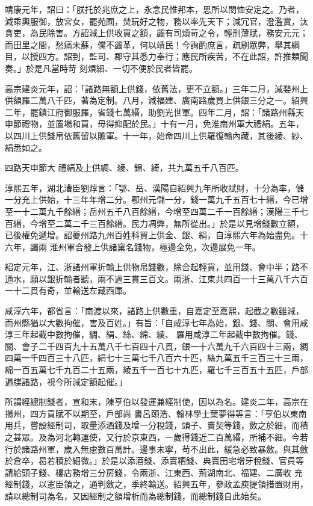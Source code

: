 \begin{pinyinscope}
 靖康元年，詔曰：「朕托於兆庶之上，永念民惟邦本，思所以閔恤安定之。乃者，減乘輿服御，放宮女，罷苑囿，焚玩好之物，務以率先天下；減冗官，澄濫賞，汰貪吏，為民除害。方詔減上供收買之額，蠲有司煩苛之令，輕刑薄賦，務安元元；而田里之間，愁痛未蘇，儻不蠲革，何以靖民！今詢酌庶言，疏剔眾弊，舉其綱目，以授四方。詔到，監司、郡守其悉力奉行；應民所疾苦，不在此詔，許推類聞奏。」於是凡當時苛
 刻煩細、一切不便於民者皆罷。



 高宗建炎元年，詔：「諸路無額上供錢，依舊法，更不立額。」三年二月，減婺州上供額羅二萬八千匹，著為定制。八月，減福建、廣南路歲買上供銀三分之一。紹興二年，罷鎮江府御服羅，省錢七萬緡，助劉光世軍。四年二月，詔：「諸路州縣天申節禮物，並置場和買，毋得抑配於民。」十有一月，免淮南州軍大禮絹。五年，以四川上供錢帛依舊留以贍軍。十一年，始命四川上供羅復輸內藏，其後綾、紗、絹悉如之。



 四路天申節大
 禮絹及上供綢、綾、錦、綺，共九萬五千八百匹。



 淳熙五年，湖北漕臣劉焞言：「鄂、岳、漢陽自紹興九年所收賦財，十分為率，儲一分充上供始，十三年年增二分。鄂州元儲一分，錢一萬九千五百七十緡，今已增至一十二萬九千餘緡；岳州五千八百餘緡，今增至四萬二千一百餘緡；漢陽三千七百緡，今增至二萬二千三百餘緡。民力凋弊，無所從出。」於是以見增錢數立額，已後權免遞增。詔夔州路九州百姓科買上供金、銀、絹，自淳熙六年為始盡免。十六年，蠲兩
 淮州軍合發上供諸窠名錢物，極邊全免，次邊展免一年。



 紹定元年，江、浙諸州軍折輸上供物帛錢數，除合起輕貨，並用錢、會中半；路不通水，願以銀折輸者聽，兩不過三貫三百文。兩浙、江東共四百一十三萬八千六百一十二貫有奇，並輸送左藏西庫。



 咸淳六年，都省言：「南渡以來，諸路上供數重，自嘉定至嘉熙，起截之數雖減，而州縣猶以大數拘催，害及百姓。」有旨：「自咸淳七年為始，銀、錢、關、會用咸淳三年起截中數拘催，綢、絹、絲、綿、綾、
 羅用咸淳二年起截中數拘催。錢、關、會子二千四百九十五萬八千七百四十八貫，銀一十六萬九千六百四十三兩，綢四萬一千四百三十八匹，絹七十三萬七千八百六十匹，絲九萬五千三百三十三兩，綿一百五萬七千九百二十五兩，綾五千一百七十九匹，羅七千三百五十五匹，戶部遍牒諸路，視今所減定額起催。」



 所謂經總制錢者，宣和末，陳亨伯以發運兼經制使，因以為名。建炎二年，高宗在揚州，四方貢賦不以期至，戶部尚
 書呂頤浩、翰林學士葉夢得等言：「亨伯以東南用兵，嘗設經制司，取量添酒錢及增一分稅錢，頭子、賣契等錢，斂之於細，而積之甚眾。及為河北轉運使，又行於京東西，一歲得錢近二百萬緡，所補不細。今若行於諸路州軍，歲入無慮數百萬計。邊事未寧，茍不出此，緩急必致暴斂。與其斂於倉卒，曷若積於細微。」於是以添酒錢、添賣糟錢、典賣田宅增牙稅錢、官員等請給頭子錢、樓店務增三分房錢，令兩浙、江東西、荊湖南北、福建、二廣收
 充經制錢，以憲臣領之，通判斂之，季終輸送。紹興五年，參政孟庾提領措置財用，請以總制司為名，又因經制之額增析而為總制錢，而總制錢自此始矣。




\end{pinyinscope}
